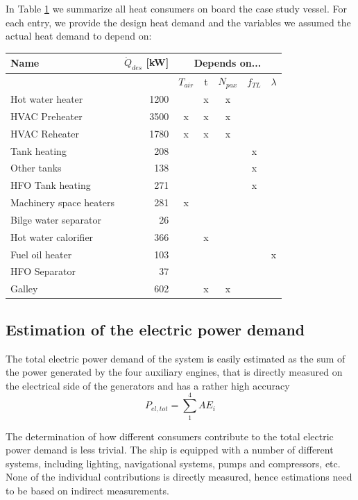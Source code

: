 \documentclass[preprint,12pt]{elsarticle}
\begin{document}
In Table \ref{tab:heatConsumers} we summarize all heat consumers on board the case study vessel. For each entry, we provide the design heat demand and the variables we assumed the actual heat demand to depend on:
\begin{table}
	\begin{tabular}{lrccccc}
		\hline 
		Name & $\dot{Q}_{des}$ [kW] & \multicolumn{5}{c}{Depends on...} \\ 
		\hline 
		 & & $T_{air}$ & t & $N_{pax}$ & $f_{TL}$ & $\lambda$ \\ 
		\hline 
		Hot water heater & 1200 &  & x & x &  &  \\ 
		HVAC Preheater & 3500 & x & x & x &  &  \\ 
		HVAC Reheater & 1780 & x & x & x &  &  \\ 
		Tank heating & 208 &  &  &  & x &  \\ 
		Other tanks & 138 &  &  &  & x &  \\ 
		HFO Tank heating & 271 &  &  &  & x &  \\ 
		Machinery space heaters & 281 & x &  &  &  &  \\ 
		Bilge water separator & 26 &  &  &  &  &  \\ 
		Hot water calorifier & 366 &  & x &  &  &  \\ 
		Fuel oil heater & 103 &  &  &  &  & x \\ 
		HFO Separator & 37 &  &  &  &  &  \\ 
		Galley & 602 &  & x & x &  &  \\
		\hline 
	\end{tabular} \label{tab:heatConsumers}
\end{table}


\subsection{Estimation of the electric power demand} \label{sec:met:electric}

The total electric power demand of the system is easily estimated as the sum of the power generated by the four auxiliary engines, that is directly measured on the electrical side of the generators and has a rather high accuracy
\begin{equation}
P_{el,tot} = \sum_{1}^{4} AE_i
\end{equation}

The determination of how different consumers contribute to the total electric power demand is less trivial. The ship is equipped with a number of different systems, including lighting, navigational systems, pumps and compressors, etc. None of the individual contributions is directly measured, hence estimations need to be based on indirect measurements. 
\end{document}
